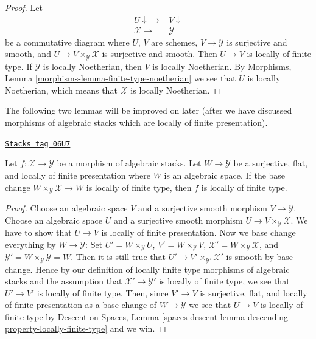 \begin{proof}
Let
$$
\begin{array}{cc}U \downarrow\longrightarrow & V \downarrow \\ \mathcal{X} \longrightarrow & \mathcal{Y}\end{array}
$$
be a commutative diagram where $U$, $V$ are schemes,
$V \to \mathcal{Y}$ is surjective and smooth, and
$U \to V \times_\mathcal{Y} \mathcal{X}$ is surjective and smooth.
Then $U \to V$ is locally of finite type. If $\mathcal{Y}$ is
locally Noetherian, then $V$ is locally Noetherian. By
Morphisms, Lemma \ref{morphisms-lemma-finite-type-noetherian}
we see that $U$ is locally Noetherian, which means that $\mathcal{X}$
is locally Noetherian.
\end{proof}

The following two lemmas will be improved on later (after we have discussed
morphisms of algebraic stacks which are locally of finite presentation).

\begin{lemma}
\label{stacks-morphisms-lemma-check-finite-type-covering}
\href{https://stacks.math.columbia.edu/tag/06U7}{\texttt{Stacks tag 06U7}}

Let $f : \mathcal{X} \to \mathcal{Y}$ be a morphism of algebraic stacks.
Let $W \to \mathcal{Y}$ be a surjective, flat, and locally of finite
presentation where $W$ is an algebraic space. If the base change
$W \times_\mathcal{Y} \mathcal{X} \to W$ is
locally of finite type, then $f$ is locally of finite type.
\end{lemma}

\begin{proof}
Choose an algebraic space $V$ and a surjective smooth morphism
$V \to \mathcal{Y}$. Choose an algebraic space $U$ and a surjective
smooth morphism $U \to V \times_\mathcal{Y} \mathcal{X}$.
We have to show that $U \to V$ is locally of finite presentation.
Now we base change everything by $W \to \mathcal{Y}$: Set
$U' = W \times_\mathcal{Y} U$,
$V' = W \times_\mathcal{Y} V$,
$\mathcal{X}' = W \times_\mathcal{Y} \mathcal{X}$,
and $\mathcal{Y}' = W \times_\mathcal{Y} \mathcal{Y} = W$.
Then it is still true that $U' \to V' \times_{\mathcal{Y}'} \mathcal{X}'$
is smooth by base change. Hence by our definition of locally finite type
morphisms of algebraic stacks and the assumption that
$\mathcal{X}' \to \mathcal{Y}'$ is locally of finite type,
we see that $U' \to V'$ is locally of finite type. Then, since
$V' \to V$ is surjective, flat, and locally of finite presentation
as a base change of $W \to \mathcal{Y}$ we see that $U \to V$ is
locally of finite type by
Descent on Spaces, Lemma
\ref{spaces-descent-lemma-descending-property-locally-finite-type}
and we win.
\end{proof}

